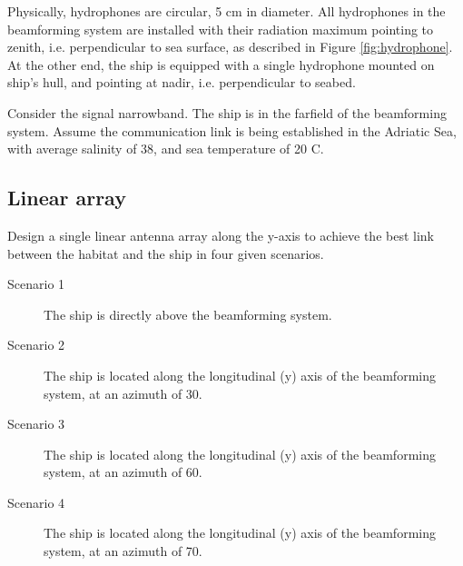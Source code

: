 \documentclass[openany]{book}
\begin{document}
	Physically, hydrophones are circular, 5 cm in diameter. All hydrophones in 
	the 
	beamforming system are installed with their radiation maximum pointing to 
	zenith, i.e. perpendicular to sea surface, as described in Figure 
	\ref{fig:hydrophone}. At the other end, the ship is equipped with a single 
	hydrophone mounted on ship's hull, and pointing at nadir, i.e. 
	perpendicular to 
	seabed.
	
	Consider the signal narrowband. The ship is in the farfield of the 
	beamforming 
	system. Assume the communication link is being established in the Adriatic 
	Sea, 
	with average salinity of 38\textperthousand, and sea temperature of 20 
	\textdegree C.
	
	\subsection{Linear array}
	
	Design a single linear antenna array along the y-axis to achieve the best 
	link 
	between the habitat and the ship in four given scenarios.
	\begin{description}
		\item[Scenario 1] The ship is directly above the beamforming system.
		\item[Scenario 2] The ship is located along the longitudinal (y) axis 
		of 
		the beamforming system, at an azimuth of 30\textdegree.
		\item[Scenario 3] The ship is located along the longitudinal (y) axis 
		of 
		the beamforming system, at an azimuth of 60\textdegree.
		\item[Scenario 4] The ship is located along the longitudinal (y) axis 
		of 
		the beamforming system, at an azimuth of 70\textdegree.
	\end{description}
	
\end{document}
